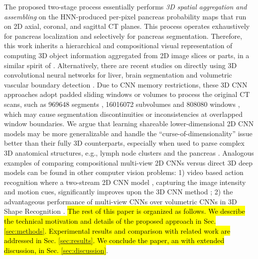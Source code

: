 \documentclass[journal]{IEEEtran}
\begin{document}
The proposed two-stage process essentially performs {\em 3D spatial aggregation and assembling} on the HNN-produced per-pixel pancreas probability maps that run on 2D axial, coronal, and sagittal CT planes. This process operates exhaustively for pancreas localization and selectively for pancreas segmentation. Therefore, this work inherits a hierarchical and compositional visual representation of computing 3D object information aggregated from 2D image slices or parts, in a similar spirit of \cite{roth2014new,Farabet2013Learning,Lu2008Accurate}. Alternatively, there are recent studies on directly using 3D convolutional neural networks for liver, brain segmentation \cite{Dou20163D,Chen2016VoxResNet} and volumetric vascular boundary detection \cite{Merkow2016Dense}. Due to CNN memory restrictions, these 3D CNN approaches adopt padded sliding windows or volumes to process the original CT scans, such as 969648 segments \cite{Merkow2016Dense}, 16016072 subvolumes \cite{Dou20163D} and 808080 windows \cite{Chen2016VoxResNet}, which may cause  segmentation discontinuities or inconsistencies at overlapped window boundaries. We argue that learning shareable lower-dimensional 2D CNN models may be more generalizable and handle the ``curse-of-dimensionality'' issue better than their fully 3D counterparts, especially when used to parse complex 3D anatomical structures, e.g., lymph node clusters \cite{Nogues2016LNC,roth2016improving} and the pancreas \cite{roth2015deeporgan,roth2016spatial}. 
Analogous examples of comparing compositional multi-view 2D CNNs versus direct 3D deep models can be found in other computer vision problems: 1) video based action recognition where a two-stream 2D CNN model \cite{Simonyan2014Two}, capturing the image intensity and motion cues, significantly improves upon the 3D CNN method \cite{Karpathy2014Large}; 2) the advantageous performance of multi-view CNNs over volumetric CNNs in 3D Shape Recognition \cite{Su2015Multi}. 
\hl{The rest of this paper is organized as follows. We describe the technical motivation and details of the proposed approach in Sec. \ref{sec:methods}. Experimental results and comparison with related work are addressed in Sec. \ref{sec:results}. We conclude the paper, an with extended discussion, in Sec. \ref{sec:discussion}}.
\end{document}
